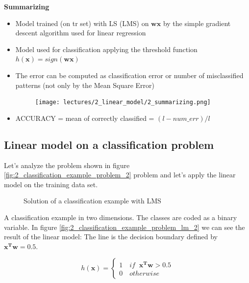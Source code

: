 \documentclass[../main.tex]{subfiles}
\begin{document}
\noindent \textbf{Summarizing}\\
\begin{itemize}
    \item Model trained (on tr set) with LS (LMS) on $\mathbf{wx}$ by the simple gradient descent algorithm used for linear regression
    
    \item Model used for classification applying the threshold function $h(\mathbf{x}) = sign(\mathbf{wx})$
    
    \item The error can be computed as classification error or number of misclassified patterns (not only by the Mean Square Error)
    \begin{figure}[H]
        \centering
        \texttt{[image: lectures/2\_linear\_model/2\_summarizing.png]}
    \end{figure}

    \item ACCURACY = mean of correctly classified = $(l-num\_err)/l$
\end{itemize}

\newpage

\subsection{Linear model on a classification problem}
Let's analyze the problem shown in figure \ref{fig:2_classification_example_problem_2} problem and let's apply the linear model on the training data set.
\begin{figure}[H]
  \centering
  \hfill
  \caption{Solution of a classification example with LMS}
\end{figure}
A classification example in two dimensions. The classes are coded as a binary variable.
In figure \ref{fig:2_classification_example_problem_lm_2} we can see the result of the linear model: The line is the decision boundary defined by $\mathbf{x^Tw} = 0.5$.

\[
    h(\textbf{x}) = \left\{
                \begin{array}{ll}
                  1 \quad if \;\; \mathbf{x^Tw}>0.5\\
                  0 \quad otherwise
                \end{array}
              \right.
\]
\end{document}
